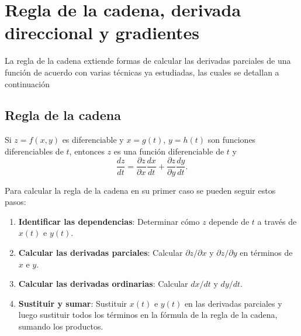 
\chapter{Regla de la cadena, derivada direccional y gradientes} 

La regla de la cadena extiende formas de calcular las derivadas parciales de una función de acuerdo con varias técnicas ya estudiadas, las cuales se detallan a continuación

\section{Regla de la cadena}

\begin{theorem}
Si $z = f(x, y)$ es diferenciable y $x = g(t)$, $y = h(t)$ son funciones diferenciables de $t$, entonces $z$ es una función diferenciable de $t$ y
\[
\frac{dz}{dt} = \frac{\partial z}{\partial x}\frac{dx}{dt} + \frac{\partial z}{\partial y}\frac{dy}{dt}.
\]
\end{theorem}

\begin{pasos} Para calcular la regla de la cadena en su primer caso se pueden seguir estos pasos: 

\begin{enumerate}
    \item \textbf{Identificar las dependencias}: Determinar cómo $z$ depende de $t$ a través de $x(t)$ e $y(t)$.
    \item \textbf{Calcular las derivadas parciales}: Calcular $\partial z/\partial x$ y $\partial z/\partial y$ en términos de $x$ e $y$.
    \item \textbf{Calcular las derivadas ordinarias}: Calcular $dx/dt$ y $dy/dt$.
    \item \textbf{Sustituir y sumar}: Sustituir $x(t)$ e $y(t)$ en las derivadas parciales y luego sustituir todos los términos en la fórmula de la regla de la cadena, sumando los productos.
\end{enumerate}
\end{pasos}

